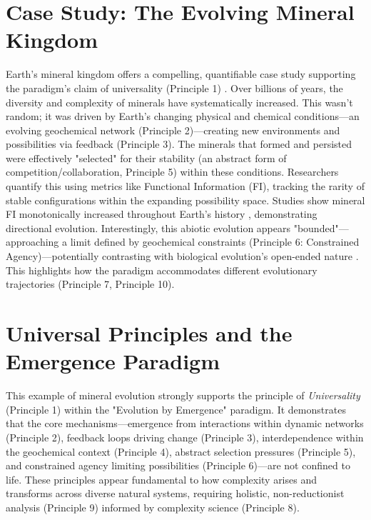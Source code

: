 \section*{Case Study: The Evolving Mineral Kingdom}

Earth's mineral kingdom offers a compelling, quantifiable case study supporting the paradigm's claim of universality (Principle 1) \cite{HazenWong2024}. Over billions of years, the diversity and complexity of minerals have systematically increased. This wasn't random; it was driven by Earth's changing physical and chemical conditions—an evolving geochemical network (Principle 2)—creating new environments and possibilities via feedback (Principle 3). The minerals that formed and persisted were effectively "selected" for their stability (an abstract form of competition/collaboration, Principle 5) within these conditions. Researchers quantify this using metrics like Functional Information (FI), tracking the rarity of stable configurations within the expanding possibility space. Studies show mineral FI monotonically increased throughout Earth's history \cite{HazenWong2024}, demonstrating directional evolution. Interestingly, this abiotic evolution appears "bounded"—approaching a limit defined by geochemical constraints (Principle 6: Constrained Agency)—potentially contrasting with biological evolution's open-ended nature \cite{HazenWong2024, WongEtAl2023}. This highlights how the paradigm accommodates different evolutionary trajectories (Principle 7, Principle 10). %

\section*{Universal Principles and the Emergence Paradigm}

This example of mineral evolution strongly supports the principle of \emph{Universality} (Principle 1) within the "Evolution by Emergence" paradigm. It demonstrates that the core mechanisms—emergence from interactions within dynamic networks (Principle 2), feedback loops driving change (Principle 3), interdependence within the geochemical context (Principle 4), abstract selection pressures (Principle 5), and constrained agency limiting possibilities (Principle 6)—are not confined to life. These principles appear fundamental to how complexity arises and transforms across diverse natural systems, requiring holistic, non-reductionist analysis (Principle 9) informed by complexity science (Principle 8). %

